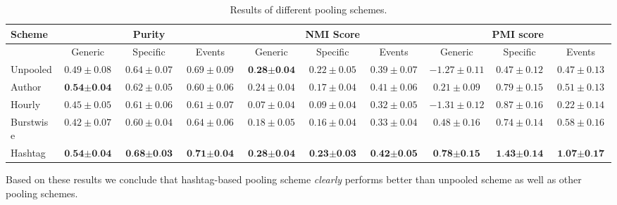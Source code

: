 \documentclass{sig-alternate}
\begin{document}
\begin{table*}[t!]
\vspace{-2mm}
\centering
\caption{Results of different pooling schemes.}\label{tbl-456}
\resizebox{17.5cm}{!} 
{
	\begin{tabular}{|l|ccc|ccc|ccc|}
	\hline
	Scheme  & \multicolumn {3}{c|}{Purity} & \multicolumn {3}{c|}{NMI Score} & \multicolumn {3}{c|}{PMI score} \\
	\hline
	 & Generic & Specific & Events &  Generic & Specific & Events &  Generic & Specific & Events \\
	\hline
	Unpooled & $ 0.49\pm 0.08 $ & $ 0.64\pm 0.07 $ & $ 0.69\pm 0.09 $ & $ \textbf{0.28} \pm \textbf{0.04} $ & $ 0.22\pm 0.05 $ & $ 0.39\pm 0.07 $ & $ -1.27\pm 0.11 $ & $ 0.47\pm 0.12 $ & $ 0.47\pm 0.13 $\\
	\hline
	Author & $ \textbf{0.54} \pm \textbf{0.04} $ & $ 0.62\pm 0.05 $ & $ 0.60\pm 0.06 $ & $ 0.24\pm 0.04 $ & $ 0.17\pm 0.04 $ & $ 0.41\pm 0.06 $ & $ 0.21\pm 0.09 $ & $ 0.79\pm 0.15 $ & $ 0.51\pm 0.13 $\\
	\hline
	Hourly & $ 0.45\pm 0.05 $ & $ 0.61\pm 0.06 $ & $ 0.61\pm 0.07 $ & $ 0.07\pm 0.04 $ & $ 0.09\pm 0.04 $ & $ 0.32\pm 0.05 $ & $ -1.31\pm 0.12 $ & $ 0.87\pm 0.16 $ & $ 0.22\pm 0.14 $\\
	\hline
	Burstwise & $ 0.42\pm 0.07 $ & $ 0.60\pm 0.04 $ & $ 0.64\pm 0.06 $ & $ 0.18\pm 0.05 $ & $ 0.16\pm 0.04 $ & $ 0.33\pm 0.04 $ & $ 0.48\pm 0.16 $ & $ 0.74\pm 0.14 $ & $ 0.58\pm 0.16 $\\
	\hline
	Hashtag & $ \textbf{0.54}\pm \textbf{0.04} $ & $ \textbf{0.68}\pm \textbf{0.03} $ & $ \textbf{0.71}\pm \textbf{0.04} $ & $ \textbf{0.28}\pm \textbf{0.04} $ & $ \textbf{0.23}\pm \textbf{0.03} $ & $ \textbf{0.42}\pm \textbf{0.05} $ & $ \textbf{0.78}\pm \textbf{0.15} $ & $ \textbf{1.43}\pm  \textbf{0.14} $ & $ \textbf{1.07}\pm\textbf{0.17} $\\
	\hline
	\end{tabular}
}
\end{table*}

Based on these results we conclude that hashtag-based pooling scheme
\emph{clearly} performs better than unpooled scheme as well as other
pooling schemes.

\begin{comment}
An obvious question to ask is: Can we do better? In
the next section we look into hashtag-based pooling in detail and
devise methods which further improve the results and provide better
topics.  We did not evaluate the held-out probability in later
experiments as it agreed generally with the other scores,
and is not as appropriate  as a quality metric for the
undirected information task.
\end{comment}
\end{document}
